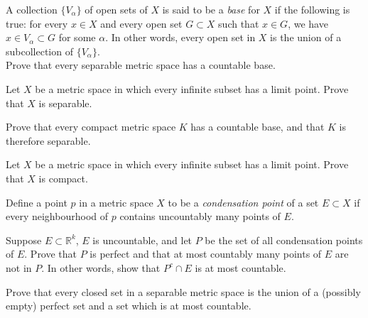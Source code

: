 \documentclass[12 pt, letterpaper]{hmcpset}
\begin{document}
\pagebreak

\begin{problem}[23.]
	A collection $\{ V_{\alpha} \}$ of open sets of $X$ is said to be a \textit{base} for $X$ if the following is true: for every $x \in X$ and every open set $G \subset X$ such that $x \in G$, we have $x \in V_{\alpha} \subset G$ for some $\alpha$. In other words, every open set in $X$ is the union of a subcollection of $\{ V_{\alpha} \}$. \\

	Prove that every separable metric space has a countable base.
\end{problem}

\pagebreak

\begin{problem}[24.]
	Let $X$ be a metric space in which every infinite subset has a limit point. Prove that $X$ is separable.
\end{problem}

\pagebreak

\begin{problem}[25.]
	Prove that every compact metric space $K$ has a countable base, and that $K$ is therefore separable.
\end{problem}

\pagebreak

\begin{problem}[26.]
	Let $X$ be a metric space in which every infinite subset has a limit point. Prove that $X$ is compact.
\end{problem}

\pagebreak

\begin{problem}[27.]
	Define a point $p$ in a metric space $X$ to be a \textit{condensation point} of a set $E \subset X$ if every neighbourhood of $p$ contains uncountably many points of $E$.

	Suppose $E \subset \mathbb{R}^{k}$, $E$ is uncountable, and let $P$ be the set of all condensation points of $E$. Prove that $P$ is perfect and that at most countably many points of $E$ are not in $P$. In other words, show that $P^{c} \cap E$ is at most countable.
\end{problem}

\pagebreak

\begin{problem}[28.]
	Prove that every closed set in a separable metric space is the union of a (possibly empty) perfect set and a set which is at most countable.
\end{problem}
\end{document}
